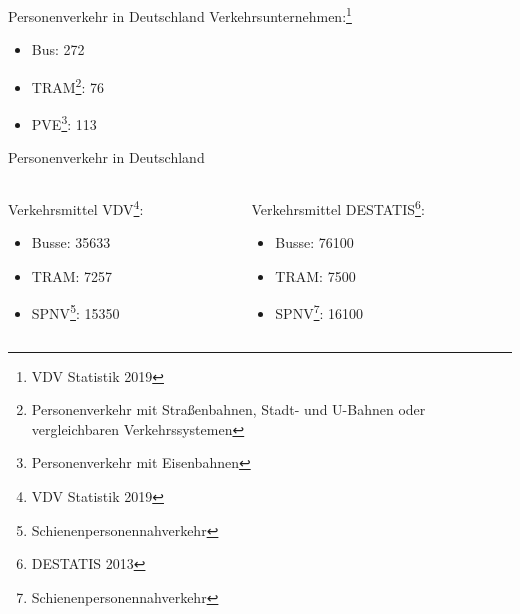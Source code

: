 
\begin{frame}{Personenverkehr in Deutschland}
  Verkehrsunternehmen:\footnote{VDV Statistik 2019}
  \begin{itemize}
    \item Bus: 272
    \item TRAM\footnote{Personenverkehr mit Straßenbahnen, Stadt- und U-Bahnen oder vergleichbaren Verkehrssystemen}: 76
    \item PVE\footnote{Personenverkehr mit Eisenbahnen}: 113
  \end{itemize}
\end{frame}

\begin{frame}{Personenverkehr in Deutschland}
  \begin{columns}

    \begin{column}{0.5\textwidth}
      \minipage[c][0.65\textheight][s]{\columnwidth}
      Verkehrsmittel VDV\footnote{VDV Statistik 2019}:
      \begin{itemize}
      \item Busse: 35633
      \item TRAM: 7257
      \item SPNV\footnote{Schienenpersonennahverkehr}: 15350
      \end{itemize}
      \endminipage
    
    \end{column}

    \begin{column}{0.5\textwidth}
      \minipage[c][0.65\textheight][s]{\columnwidth}
    Verkehrsmittel DESTATIS\footnote{DESTATIS 2013}:
    \begin{itemize}
    \item Busse: 76100
    \item TRAM: 7500
    \item SPNV\footnote{Schienenpersonennahverkehr}: 16100
    \end{itemize}
    \endminipage
    \end{column}

  \end{columns}
\end{frame}

